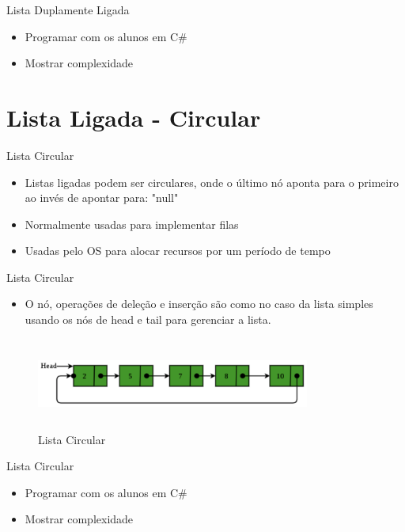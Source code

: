 \begin{frame}
	\begin{block}{Lista Duplamente Ligada}
	\begin{itemize}
			\item Programar com os alunos em C\#
			\item Mostrar complexidade
		\end{itemize}
	\end{block}
\end{frame}

\section{Lista Ligada - Circular}
\begin{frame}
	\begin{block}{Lista Circular}
	\begin{itemize}
			\item Listas ligadas podem ser circulares, onde o último nó aponta para o primeiro ao invés de apontar para: "null"

			\item Normalmente usadas para implementar filas
			
			\item Usadas pelo OS para alocar recursos por um período de tempo

		\end{itemize}
	\end{block}
\end{frame}

\begin{frame}
	\begin{block}{Lista Circular}
	\begin{itemize}
			\item O nó, operações de deleção e inserção são como no caso da lista simples usando os nós de head e tail para gerenciar a lista.
	\end{itemize}
		\begin{figure}[!htb]
			\centering	  				
			\includegraphics[height=3cm, width = 9cm]{./pic/ListaCircular.png}
			\caption{Lista Circular \cite{GEEKS_2018}}
			\label{fig_LDE_midle2}
		\end{figure}
	\end{block}
\end{frame}

\begin{frame}
	\begin{block}{Lista Circular}
	\begin{itemize}
			\item Programar com os alunos em C\#
			\item Mostrar complexidade
		\end{itemize}
	\end{block}
\end{frame}
